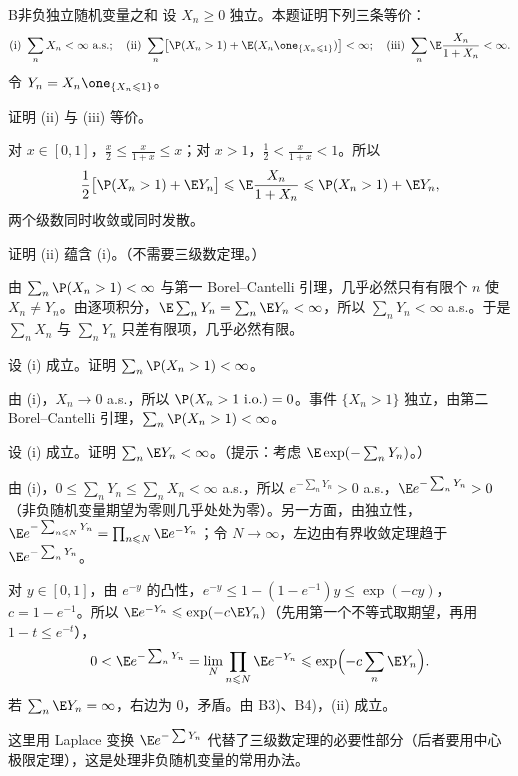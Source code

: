\begin{probleme}{B}{非负独立随机变量之和}
设 $X_n\geqslant0$ 独立。本题证明下列三条等价：
\[
\text{(i)}\ \sum_nX_n<\infty\ \text{a.s.};\quad\text{(ii)}\ \sum_n\bigl[\P(X_n>1)+\E(X_n\one_{\{X_n\leqslant1\}})\bigr]<\infty;\quad\text{(iii)}\ \sum_n\E\frac{X_n}{1+X_n}<\infty .
\]
令 $Y_n=X_n\one_{\{X_n\leqslant1\}}$。
\begin{questions}
\item 证明 (ii) 与 (iii) 等价。
\begin{solution}
对 $x\in[0,1]$，$\frac x2\leqslant\frac x{1+x}\leqslant x$；对 $x>1$，$\frac12<\frac x{1+x}<1$。所以
\[
\frac12\bigl[\P(X_n>1)+\E Y_n\bigr]\leqslant \E\frac{X_n}{1+X_n}\leqslant \P(X_n>1)+\E Y_n,
\]
两个级数同时收敛或同时发散。
\end{solution}
\item 证明 (ii) 蕴含 (i)。（不需要三级数定理。）
\begin{solution}
由 $\sum_n\P(X_n>1)<\infty$ 与第一 Borel--Cantelli 引理，几乎必然只有有限个 $n$ 使 $X_n\neq Y_n$。由逐项积分，$\E\sum_nY_n=\sum_n\E Y_n<\infty$，所以 $\sum_nY_n<\infty$ a.s.。于是 $\sum_nX_n$ 与 $\sum_nY_n$ 只差有限项，几乎必然有限。
\end{solution}
\item 设 (i) 成立。证明 $\sum_n\P(X_n>1)<\infty$。
\begin{solution}
由 (i)，$X_n\to0$ a.s.，所以 $\P(X_n>1\ \text{i.o.})=0$。事件 $\{X_n>1\}$ 独立，由第二 Borel--Cantelli 引理，$\sum_n\P(X_n>1)<\infty$。
\end{solution}
\item 设 (i) 成立。证明 $\sum_n\E Y_n<\infty$。（提示：考虑 $\E\exp(-\sum_nY_n)$。）
\begin{solution}
由 (i)，$0\leqslant\sum_nY_n\leqslant\sum_nX_n<\infty$ a.s.，所以 $e^{-\sum_nY_n}>0$ a.s.，$\E e^{-\sum_nY_n}>0$（非负随机变量期望为零则几乎处处为零）。另一方面，由独立性，$\E e^{-\sum_{n\leqslant N}Y_n}=\prod_{n\leqslant N}\E e^{-Y_n}$；令 $N\to\infty$，左边由有界收敛定理趋于 $\E e^{-\sum_nY_n}$。

对 $y\in[0,1]$，由 $e^{-y}$ 的凸性，$e^{-y}\leqslant1-(1-e^{-1})y\leqslant\exp(-cy)$，$c=1-e^{-1}$。所以 $\E e^{-Y_n}\leqslant\exp(-c\E Y_n)$（先用第一个不等式取期望，再用 $1-t\leqslant e^{-t}$），
\[
0<\E e^{-\sum_nY_n}=\lim_N\prod_{n\leqslant N}\E e^{-Y_n}\leqslant\exp\Bigl(-c\sum_n\E Y_n\Bigr).
\]
若 $\sum_n\E Y_n=\infty$，右边为 $0$，矛盾。由 B3)、B4)，(ii) 成立。

这里用 Laplace 变换 $\E e^{-\sum Y_n}$ 代替了三级数定理的必要性部分（后者要用中心极限定理），这是处理非负随机变量的常用办法。
\end{solution}
\end{questions}
\end{probleme}

